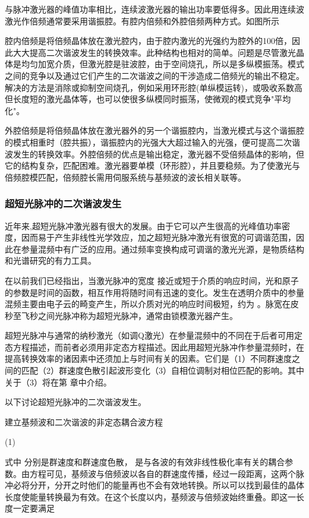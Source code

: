 与脉冲激光器的峰值功率相比，连续波激光器的输出功率要低得多。因此用连续波激光作倍频通常要采用谐振腔。有腔内倍频和外腔倍频两种方式。如图所示
           
腔内倍频是将倍频晶体放在激光腔内，由于腔内激光的光强约为腔外的100倍，因此大大提高二次谐波发生的转换效率。此种结构也相对的简单。问题是尽管激光晶体是均匀加宽介质，但激光腔是驻波腔，由于空间烧孔，所以是多纵模振荡。模式之间的竞争以及通过它们产生的二次谐波之间的干涉造成二倍频光的输出不稳定。解决的方法是消除或抑制空间烧孔，例如采用环形腔(单纵模运转)，或吸收系数高但长度短的激光晶体等，也可以使很多纵模同时振荡，使微观的模式竞争"平均化"。

外腔倍频是将倍频晶体放在激光器外的另一个谐振腔内，当激光模式与这个谐振腔的模式相重时（腔共振），谐振腔内的光强大大超过输入的光强，便可提高二次谐波发生的转换效率。外腔倍频的优点是输出稳定，激光器不受倍频晶体的影响，但它的结构复杂，匹配困难。激光器要单模（环形腔），并且要稳频。为了使激光与倍频腔模匹配，倍频腔长需用伺服系统与基频波的波长相关联等。

\subsubsection{超短光脉冲的二次谐波发生}

近年来,超短光脉冲激光器有很大的发展。由于它可以产生很高的光峰值功率密度，因而易于产生非线性光学效应，加之超短光脉冲激光有很宽的可调谐范围，因此在参量混频中有广泛的应用。通过频率变换构成可调谐的激光光源，是物质结构和光谱研究的有力工具。

在以前我们已经指出，当激光脉冲的宽度 接近或短于介质的响应时间，光和原子的参数是时间的函数，相互作用将随时间有迅速的变化。发生在透明介质中的参量混频主要由电子云的畸变产生，所以介质对光的响应时间极短，约为 。脉宽在皮秒至飞秒之间光脉冲称为超短光脉冲，通常由锁模激光器产生。

超短光脉冲与通常的纳秒激光（如调Q激光）在参量混频中的不同在于后者可用定态方程描述，而前者必须用非定态方程描述。因此用超短光脉冲作参量混频时，在提高转换效率的诸因素中还须加上与时间有关的因素。它们是（1）不同群速度之间的匹配（2）群速度色散引起波形变化（3）自相位调制对相位匹配的影响。其中关于（3）将在第  章中介绍。

以下讨论超短光脉冲的二次谐波发生。

建立基频波和二次谐波的非定态耦合波方程

            (1)          

式中 分别是群速度和群速度色散， 是与各波的有效非线性极化率有关的耦合参数。由方程可见，基频波与倍频波以各自的群速度传播，经过一段距离，这两个脉冲必将分开，分开之时他们的能量再也不会有效地转换。所以可以找到最佳的晶体长度使能量转换最为有效。在这个长度以内，基频波与倍频波始终重叠。即这一长度一定要满足

